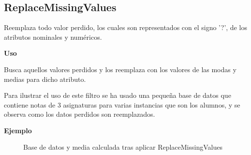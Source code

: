 \newpage
	\subsection{ReplaceMissingValues}
	Reemplaza todo valor perdido, los cuales son representados con el signo '?', de los atributos nominales y numéricos.

	\begin{justify}
	\textbf{Uso} 
	\end{justify}

	Busca aquellos valores perdidos y los reemplaza con los valores de las modas y medias para dicho atributo.

	Para ilustrar el uso de este filtro se ha usado una pequeña base de datos que contiene notas de 3 asignaturas para varias instancias que son los alumnos, y se observa como los datos perdidos son reemplazados.

	
	\begin{justify}
	\textbf{Ejemplo}
	\end{justify}

	\begin{figure}[!htp]

	\centering
	\caption{Base de datos y media calculada tras aplicar ReplaceMissingValues}
	\end{figure}
  
